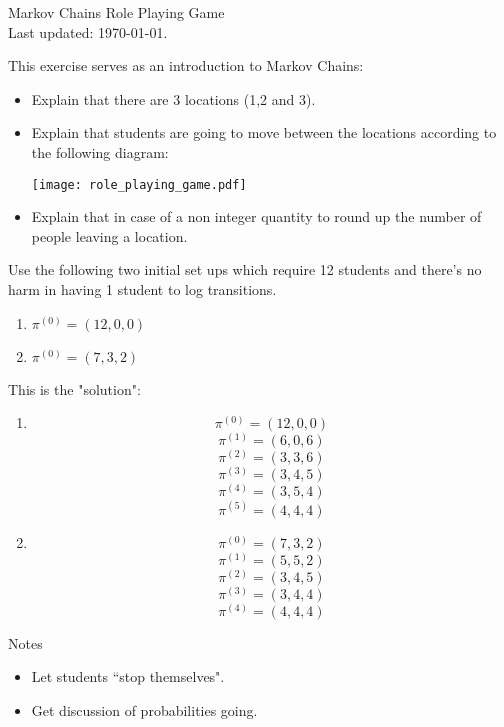 \documentclass[12pt]{article}
\begin{document}
\begin{center}
\Huge{Markov Chains Role Playing Game}\\
\tiny{Last updated: \today.}
\end{center}

This exercise serves as an introduction to Markov Chains:
\begin{itemize}
\item Explain that there are 3 locations (1,2 and 3).
\item Explain that students are going to move between the locations according to the following diagram:
\begin{center}
\texttt{[image: role\_playing\_game.pdf]}
\end{center}
\item Explain that in case of a non integer quantity to round up the number of people leaving a location.
\end{itemize}

Use the following two initial set ups which require 12 students and there's no harm in having 1 student to log transitions.

\begin{enumerate}
\item $\pi^{(0)}=(12,0,0)$
\item $\pi^{(0)}=(7,3,2)$
\end{enumerate}

This is the "solution":

\begin{enumerate}
\item
$$\pi^{(0)}=(12,0,0)$$
$$\pi^{(1)}=(6,0,6)$$
$$\pi^{(2)}=(3,3,6)$$
$$\pi^{(3)}=(3,4,5)$$
$$\pi^{(4)}=(3,5,4)$$
$$\pi^{(5)}=(4,4,4)$$
\item
$$\pi^{(0)}=(7,3,2)$$
$$\pi^{(1)}=(5,5,2)$$
$$\pi^{(2)}=(3,4,5)$$
$$\pi^{(3)}=(3,4,4)$$
$$\pi^{(4)}=(4,4,4)$$
\end{enumerate}


Notes
\begin{itemize}
\item Let students ``stop themselves".
\item Get discussion of probabilities going.
\end{itemize}
\end{document}
